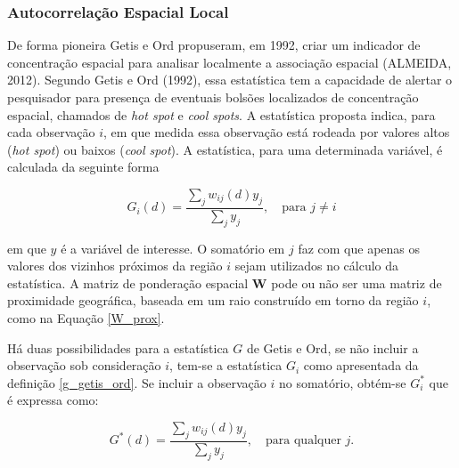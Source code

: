 \documentclass[12pt, a4paper,brazil,oneside]{article}
\begin{document}
	
	
	
	
	\subsubsection{Autocorrelação Espacial Local}
	
	
	
	De forma pioneira Getis e Ord propuseram, em 1992, criar um indicador de concentração espacial para analisar localmente a associação espacial (ALMEIDA, 2012). Segundo Getis e Ord (1992), essa estatística tem a capacidade de alertar o pesquisador para presença de eventuais bolsões localizados de concentração espacial, chamados de \textit{hot spot} e \textit{cool spots}. A estatística proposta indica, para cada observação $i$, em que medida essa observação está rodeada por valores altos (\textit{hot spot}) ou baixos (\textit{cool spot}). A estatística, para uma determinada variável, é calculada da seguinte forma 
	
	\begin{equation}
	G_i(d) = \dfrac{\sum_{j} w_{ij}(d) y_j}{\sum_{j}  y_j},\quad \text{para  $j \neq i$}
	\label{g_getis_ord_l}
	\end{equation}
	
	\noindent em que $y$ é a variável de interesse. O somatório em $j$ faz com que apenas os valores dos vizinhos próximos da região $i$ sejam utilizados no cálculo da estatística. A matriz de ponderação espacial $\boldsymbol{W}$ pode ou não ser uma matriz de proximidade geográfica, baseada em um raio construído em torno da região $i$, como na Equação \ref{W_prox}. 
	
	Há duas possibilidades para a estatística $G$ de Getis e Ord, se não incluir a observação sob consideração $i$, tem-se a estatística $G_i$ como apresentada da definição \ref{g_getis_ord}. Se incluir a observação $i$ no somatório, obtém-se $G_i^*$ que é expressa como: 
	
	\begin{equation}
	G^*(d) = \dfrac{\sum_{j} w_{ij}(d) y_j}{\sum_{j}  y_j},\quad \text{para qualquer } j.
	\label{g_getis_ord}
	\end{equation}
	
\end{document}
